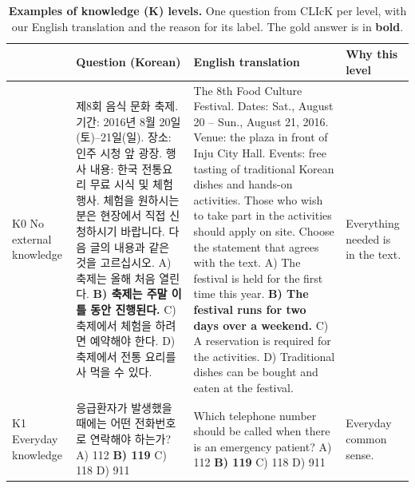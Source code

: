 \begin{table}[t]
\centering
\small
\caption{\textbf{Examples of knowledge (K) levels.}
One question from CLIcK per level, with our English translation and the reason for its label.
The gold answer is in \textbf{bold}.}
\label{tab:k_examples}
\begin{tabular}{@{}p{}p{}p{}p{}@{}}
\toprule
 & \textbf{Question (Korean)} & \textbf{English translation} & \textbf{Why this level} \\
\midrule
K0 \newline No external knowledge
& 제8회 음식 문화 축제. 기간: 2016년 8월 20일(토)--21일(일). 장소: 인주 시청 앞 광장. 행사 내용: 한국 전통요리 무료 시식 및 체험 행사. 체험을 원하시는 분은 현장에서 직접 신청하시기 바랍니다.
\newline 다음 글의 내용과 같은 것을 고르십시오.
\newline A) 축제는 올해 처음 열린다.
\newline \textbf{B) 축제는 주말 이틀 동안 진행된다.}
\newline C) 축제에서 체험을 하려면 예약해야 한다.
\newline D) 축제에서 전통 요리를 사 먹을 수 있다.
& The 8th Food Culture Festival. Dates: Sat., August 20 -- Sun., August 21, 2016. Venue: the plaza in front of Inju City Hall. Events: free tasting of traditional Korean dishes and hands-on activities. Those who wish to take part in the activities should apply on site.
\newline Choose the statement that agrees with the text.
\newline A) The festival is held for the first time this year.
\newline \textbf{B) The festival runs for two days over a weekend.}
\newline C) A reservation is required for the activities.
\newline D) Traditional dishes can be bought and eaten at the festival.
& Everything needed is in the text. \\
\midrule
K1 \newline Everyday knowledge
& 응급환자가 발생했을 때에는 어떤 전화번호로 연락해야 하는가?
\newline A) 112 \quad \textbf{B) 119} \quad C) 118 \quad D) 911
& Which telephone number should be called when there is an emergency patient?
\newline A) 112 \quad \textbf{B) 119} \quad C) 118 \quad D) 911
& Everyday common sense. \\

\end{tabular}
\end{table}
